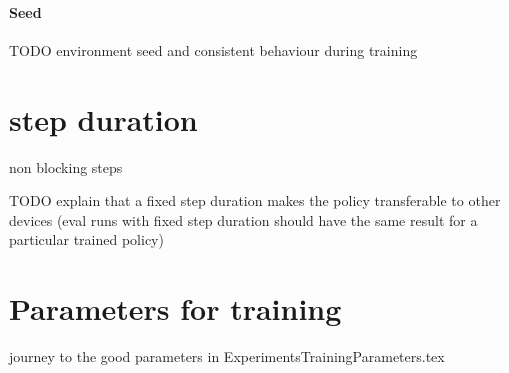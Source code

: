 \paragraph{Seed}

TODO environment seed and consistent behaviour during training

\section{step duration}
non blocking steps

TODO explain that a fixed step duration makes the policy transferable to other devices (eval runs with fixed step duration should have the same result for a particular trained policy)

\section{Parameters for training}

journey to the good parameters in ExperimentsTrainingParameters.tex
